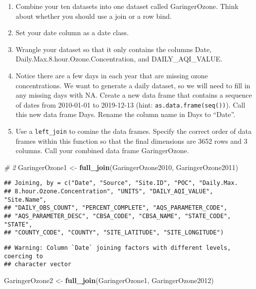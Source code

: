\documentclass[
]{article}
\newenvironment{Shaded}{\begin{snugshade}}{\end{snugshade}}
\newcommand{\CommentTok}[1]{\textcolor[rgb]{0.56,0.35,0.01}{\textit{#1}}}
\newcommand{\KeywordTok}[1]{\textcolor[rgb]{0.13,0.29,0.53}{\textbf{#1}}}
\newcommand{\NormalTok}[1]{#1}
\newcommand{\StringTok}[1]{\textcolor[rgb]{0.31,0.60,0.02}{#1}}
\begin{document}
\begin{enumerate}
\def\labelenumi{\arabic{enumi}.}
\setcounter{enumi}{1}
\item
  Combine your ten datasets into one dataset called GaringerOzone. Think
  about whether you should use a join or a row bind.
\item
  Set your date column as a date class.
\item
  Wrangle your dataset so that it only contains the columns Date,
  Daily.Max.8.hour.Ozone.Concentration, and DAILY\_AQI\_VALUE.
\item
  Notice there are a few days in each year that are missing ozone
  concentrations. We want to generate a daily dataset, so we will need
  to fill in any missing days with NA. Create a new data frame that
  contains a sequence of dates from 2010-01-01 to 2019-12-13 (hint:
  \texttt{as.data.frame(seq())}). Call this new data frame Days. Rename
  the column name in Days to ``Date''.
\item
  Use a \texttt{left\_join} to comine the data frames. Specify the
  correct order of data frames within this function so that the final
  dimensions are 3652 rows and 3 columns. Call your combined data frame
  GaringerOzone.
\end{enumerate}

\begin{Shaded}
\begin{Highlighting}[]
\CommentTok{# 2 }
\NormalTok{GaringerOzone1 <-}\StringTok{ }\KeywordTok{full_join}\NormalTok{(GaringerOzone2010, GaringerOzone2011)}
\end{Highlighting}
\end{Shaded}

\begin{verbatim}
## Joining, by = c("Date", "Source", "Site.ID", "POC", "Daily.Max.
## 8.hour.Ozone.Concentration", "UNITS", "DAILY_AQI_VALUE", "Site.Name",
## "DAILY_OBS_COUNT", "PERCENT_COMPLETE", "AQS_PARAMETER_CODE",
## "AQS_PARAMETER_DESC", "CBSA_CODE", "CBSA_NAME", "STATE_CODE", "STATE",
## "COUNTY_CODE", "COUNTY", "SITE_LATITUDE", "SITE_LONGITUDE")
\end{verbatim}

\begin{verbatim}
## Warning: Column `Date` joining factors with different levels, coercing to
## character vector
\end{verbatim}

\begin{Shaded}
\begin{Highlighting}[]
\NormalTok{GaringerOzone2 <-}\StringTok{ }\KeywordTok{full_join}\NormalTok{(GaringerOzone1, GaringerOzone2012)}
\end{Highlighting}
\end{Shaded}
\end{document}
